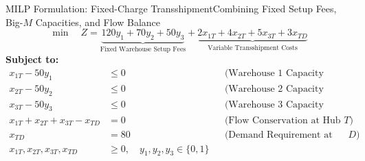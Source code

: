 \documentclass[aspectratio=169]{beamer}
\begin{document}
\begin{frame}{MILP Formulation: Fixed-Charge Transshipment}{Combining Fixed Setup Fees, Big-$M$ Capacities, and Flow Balance}
  \footnotesize
  \[
    \min \quad Z = \underbrace{120y_1 + 70y_2 + 50y_3}_{\text{Fixed Warehouse Setup Fees}} + \underbrace{2x_{1T} + 4x_{2T} + 5x_{3T} + 3x_{TD}}_{\text{Variable Transshipment Costs}}
  \]
  \textbf{Subject to:}
  \begin{align*}
    x_{1T} - 50y_1 &\le 0 && \text{(Warehouse 1 Capacity \& Activation)} \\
    x_{2T} - 50y_2 &\le 0 && \text{(Warehouse 2 Capacity \& Activation)} \\
    x_{3T} - 50y_3 &\le 0 && \text{(Warehouse 3 Capacity \& Activation)} \\[3pt]
    x_{1T} + x_{2T} + x_{3T} - x_{TD} &= 0 && \text{(Flow Conservation at Hub } T\text{)} \\
    x_{TD} &= 80 && \text{(Demand Requirement at Sink } D\text{)} \\[3pt]
    x_{1T}, x_{2T}, x_{3T}, x_{TD} &\ge 0, \quad y_1, y_2, y_3 \in \{0, 1\}
  \end{align*}
\end{frame}
\end{document}
